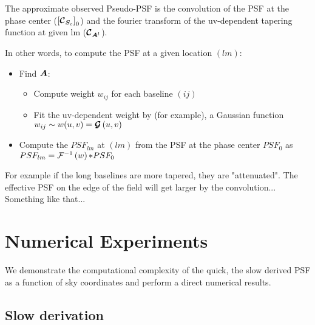The approximate observed Pseudo-PSF is the convolution of the PSF at
the phase center ($\left[\bm{\mathcal{C}}_{\bm{S}_{c}}\right]_0$) and the fourier transform of the uv-dependent tapering function at given
lm ($\bm{\mathcal{C}}_{\bm{A}^l}$).

In other words, to compute the PSF at a given location $(lm)$:

\begin{itemize}
  \item Find $\bm{A}$:
    \begin{itemize}
    \item Compute weight $w_{ij}$ for each baseline $(ij)$
    \item Fit the uv-dependent weight by (for example), a Gaussian function $w_{ij}\sim w(u,v)=\bm{\mathcal{G}}\left(u,v\right)$ 
    \end{itemize}
  \item Compute the $PSF_{lm}$ at $(lm)$ from the PSF at the phase center $PSF_0$ as $PSF_{lm}=\mathcal{F}^{-1}\left(w\right)\mathcal{*} PSF_0$
\end{itemize}
For example if the long baselines are more tapered, they are
"attenuated". The effective PSF on the edge of the field will get
larger by the convolution...
Something like that...
\section{Numerical Experiments}
We demonstrate the computational complexity of the quick, the slow derived PSF as a function of sky coordinates and 
perform a direct numerical results.
\subsection{Slow derivation}
